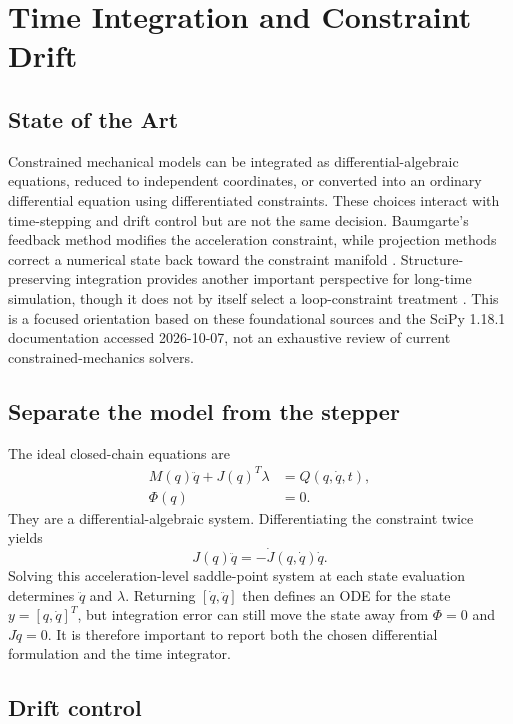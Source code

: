 \documentclass[../main.tex]{subfiles}
\begin{document}
\chapter{Time Integration and Constraint Drift}
\label{chap:integration-drift}

\section{State of the Art}
Constrained mechanical models can be integrated as differential-algebraic equations, reduced to independent coordinates, or converted into an ordinary differential equation using differentiated constraints. These choices interact with time-stepping and drift control but are not the same decision. Baumgarte's feedback method modifies the acceleration constraint, while projection methods correct a numerical state back toward the constraint manifold \cite{baumgarte1972stabilization,ascherpetzold1998}. Structure-preserving integration provides another important perspective for long-time simulation, though it does not by itself select a loop-constraint treatment \cite{hairer2006geometric}. This is a focused orientation based on these foundational sources and the SciPy 1.18.1 documentation accessed 2026-10-07, not an exhaustive review of current constrained-mechanics solvers.

\section{Separate the model from the stepper}
The ideal closed-chain equations are
\begin{align}
 M(q)\ddot q + J(q)^T\lambda &= Q(q,\dot q,t),\\
 \Phi(q)&=0.
\end{align}
They are a differential-algebraic system. Differentiating the constraint twice yields
\begin{equation}
 J(q)\ddot q = -\dot J(q,\dot q)\dot q.
\end{equation}
Solving this acceleration-level saddle-point system at each state evaluation determines \(\ddot q\) and \(\lambda\). Returning \([\dot q,\ddot q]\) then defines an ODE for the state \(y=[q,\dot q]^T\), but integration error can still move the state away from \(\Phi=0\) and \(J\dot q=0\). It is therefore important to report both the chosen differential formulation and the time integrator.

\section{Drift control}
\end{document}
